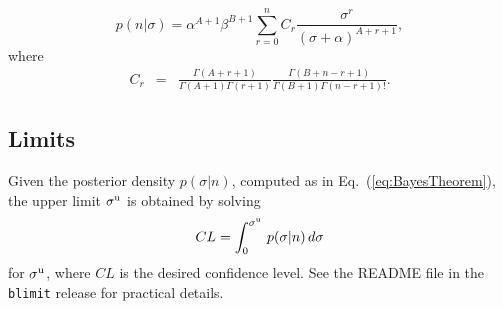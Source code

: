 \documentclass[preprint,eqsecnum,aps]{revtex4}
\newcommand{\B}{{\cal B}}
\newcommand{\sigU}{\sigma^{\rm u}}
\newcommand{\sigM}{\sigma^{\rm max}}
\newcommand{\prior}[1]{\pi(#1)}
\newcommand{\pdf}[2]{p(#1|#2)}
\newcommand{\Eq}[1]{Eq.\ (\ref{eq:#1})}
\begin{document}
\begin{equation}
\pdf{n}{\sigma} = \alpha^{A+1} \beta^{B+1} 
	\sum_{r=0}^n C_r \frac{\sigma^r}{(\sigma + \alpha)^{A+r+1}},
\end{equation}
where
\begin{eqnarray}
C_r & = & \frac{\Gamma(A+r+1)}{\Gamma(A+1) \Gamma(r+1)}
\frac{\Gamma(B+n-r+1)}{\Gamma(B+1) \Gamma(n-r+1)!}.
\end{eqnarray}

\subsection{Limits}
Given the posterior density $\pdf{\sigma}{n}$, computed as in
\Eq{BayesTheorem}, the upper limit $\sigU$ is obtained by
solving
\begin{equation}
\label{eq:CLimit} CL = \int_0^{\sigU} \, \pdf{\sigma}{n} \,
d\sigma
\end{equation}
for $\sigU$, where $CL$ is the desired confidence level.
See the README file in the {\tt blimit} release 
for practical details.




\end{document}
